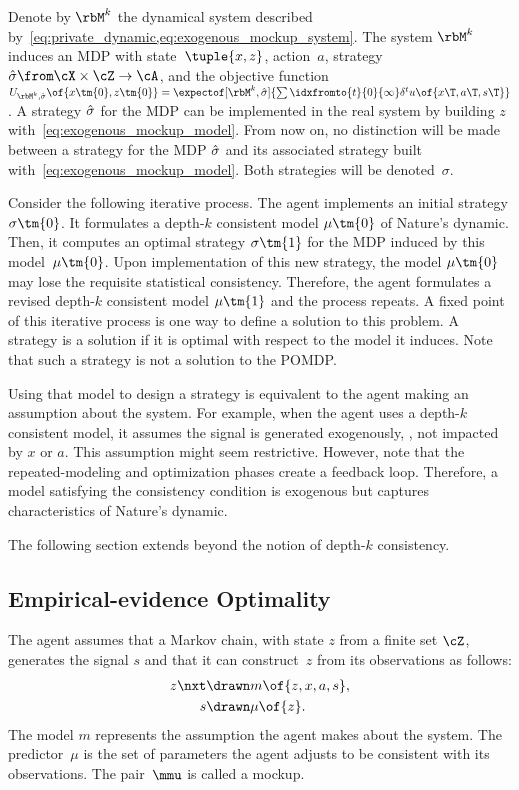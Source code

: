 Denote by \(\rbM\K\) the dynamical system described by~\cref{eq:private_dynamic,eq:exogenous_mockup_system}.
The system \(\rbM\K\) induces an MDP with state~\(\tuple{x, z}\), action~\(a\), strategy~\(\sigmahat \from \cX \times \cZ \to \cA\), and the objective function~\(U\params{\rbM\K, \sigmahat}\of{x\tm{0}, z\tm{0}} = \expectof[\rbM\K, \sigmahat]{\sum\idxfromto{t}{0}{\infty} \delta^t u \of{x\T, a\T, s\T}}\).
A strategy \(\hat{\sigma}\) for the MDP can be implemented in the real system by building \(z\) with~\cref{eq:exogenous_mockup_model}.
From now on, no distinction will be made between a strategy for the MDP \(\hat{\sigma}\) and its associated strategy built with~\cref{eq:exogenous_mockup_model}.
Both strategies will be denoted~\(\sigma\).

Consider the following iterative process.
The agent implements an initial strategy \(\sigma\tm{0}\).
It formulates a depth-\(k\) consistent model \(\mu\tm{0}\) of Nature's dynamic.
Then, it computes an optimal strategy \(\sigma\tm{1}\) for the MDP induced by this model~\(\mu\tm{0}\).
Upon implementation of this new strategy, the model \(\mu\tm{0}\) may lose the requisite statistical consistency.
Therefore, the agent formulates a revised depth-\(k\) consistent model \(\mu\tm{1}\) and the process repeats.
A fixed point of this iterative process is one way to define a solution to this problem.
A strategy is a solution if it is optimal with respect to the model it induces.
Note that such a strategy is not a solution to the POMDP.

Using that model to design a strategy is equivalent to the agent making an assumption about the system.
For example, when the agent uses a depth-\(k\) consistent model, it assumes the signal is generated exogenously, \ie, not impacted by \(x\) or \(a\).
This assumption might seem restrictive.
However, note that the repeated-modeling and optimization phases create a feedback loop.
Therefore, a model satisfying the consistency condition is exogenous but captures characteristics of Nature's dynamic.

The following section extends beyond the notion of depth-\(k\) consistency.

\subsection{Empirical-evidence Optimality}
\label{sec:empirical_evidence_optimality}

The agent assumes that a Markov chain, with state \(z\) from a finite set \(\cZ\), generates the signal \(s\) and that it can construct~\(z\) from its observations as follows:
\begin{subequations}
\label{eq:mockup_system}
\begin{align}
\label{eq:mockup_model}
z\nxt &\drawn m \of{z, x, a, s}, \\
\label{eq:mockup_predictor}
s &\drawn \mu \of{z}.
\end{align}
\end{subequations}
The model \(m\) represents the assumption the agent makes about the system.
The predictor~\(\mu\) is the set of parameters the agent adjusts to be consistent with its observations.
The pair~\(\mmu\) is called a mockup.

